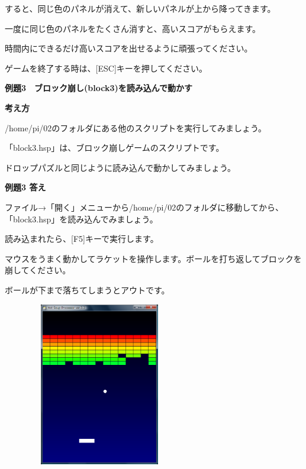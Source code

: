 \documentclass[a4paper,dvipdfmx]{jarticle}
\newcommand\textstyleqwerty[1]{#1}
\begin{document}
すると、同じ色のパネルが消えて、新しいパネルが上から降ってきます。

一度に同じ色のパネルをたくさん消すと、高いスコアがもらえます。

時間内にできるだけ高いスコアを出せるように頑張ってください。


\bigskip

ゲームを終了する時は、[ESC]キーを押してください。


\bigskip

\clearpage
\textstyleqwerty{\textbf{例題3　ブロック崩し(block3)を読み込んで動かす}}


\bigskip

{\bfseries
考え方}


\bigskip

/home/pi/02のフォルダにある他のスクリプトを実行してみましょう。

「block3.hsp」は、ブロック崩しゲームのスクリプトです。

ドロップパズルと同じように読み込んで動かしてみましょう。


\bigskip


\bigskip


\bigskip

{\bfseries
例題3 答え}


\bigskip

ファイル→「開く」メニューから/home/pi/02のフォルダに移動してから、「block3.hsp」を読み込んでみましょう。

読み込まれたら、[F5]キーで実行します。


\bigskip

マウスをうまく動かしてラケットを操作します。ボールを打ち返してブロックを崩してください。

ボールが下まで落ちてしまうとアウトです。


\bigskip



\begin{center}
\includegraphics[width=8.467cm,height=7.17cm]{text02-img/text02-img016.png}

\end{center}
\end{document}
